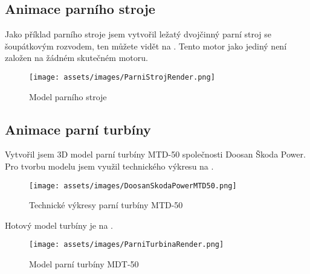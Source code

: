 \subsection{Animace parního stroje}
{Jako příklad parního stroje jsem vytvořil ležatý dvojčinný parní stroj se šoupátkovým rozvodem, ten můžete vidět na . Tento motor jako jediný není založen na žádném skutečném motoru.}
\begin{figure}[H]
    \centering
    \texttt{[image: assets/images/ParniStrojRender.png]}
    \caption{Model parního stroje \jaObr}
    \label{obr:ParniStrojRender}
\end{figure}
\newpage
\subsection{Animace parní turbíny}
{Vytvořil jsem 3D model parní turbíny MTD-50 společnosti Doosan Škoda Power. Pro tvorbu modelu jsem využil technického výkresu na .}
\cite{SP:ApplicationAspectsOfSteamTurbinesForCombinedHeatAndPowerGeneration}
\begin{figure}[H]
    \centering
    \texttt{[image: assets/images/DoosanSkodaPowerMTD50.png]}
    \caption{Technické výkresy parní turbíny MTD-50 \cite{SP:ApplicationAspectsOfSteamTurbinesForCombinedHeatAndPowerGeneration}}
    \label{obr:DoosanSkodaPowerMTD50}
\end{figure}
{Hotový model turbíny je na .}
\begin{figure}[H]
    \centering
    \texttt{[image: assets/images/ParniTurbinaRender.png]}
    \caption{Model parní turbíny MDT-50 \jaObr}
    \label{obr:ParniTurbinaRender}
\end{figure}
\newpage
